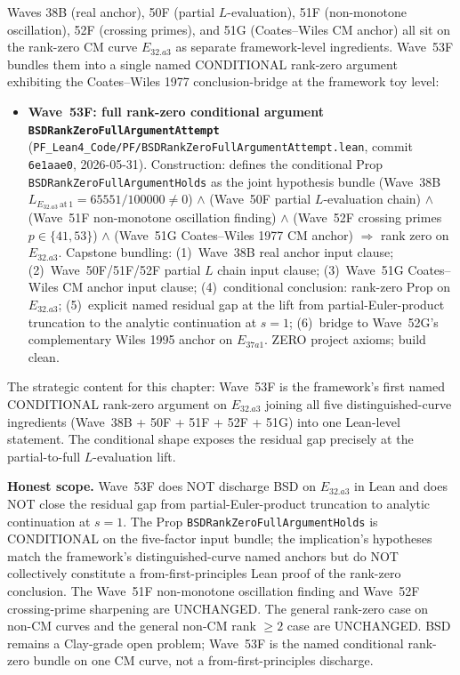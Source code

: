 \begin{remark}\label{rem:bsd-wave53f-lean}
Waves 38B (real anchor), 50F (partial $L$-evaluation), 51F (non-monotone oscillation), 52F (crossing primes), and 51G (Coates--Wiles CM anchor) all sit on the rank-zero CM curve $E_{32.a3}$ as separate framework-level ingredients. Wave~53F bundles them into a single named CONDITIONAL rank-zero argument exhibiting the Coates--Wiles 1977 conclusion-bridge at the framework toy level:
\begin{itemize}
  \item \textbf{Wave~53F: full rank-zero conditional argument \texttt{BSDRankZeroFullArgumentAttempt}} (\texttt{PF\_Lean4\_Code/PF/BSDRankZeroFullArgumentAttempt.lean}, commit \texttt{6e1aae0}, 2026-05-31). Construction: defines the conditional Prop \texttt{BSDRankZeroFullArgumentHolds} as the joint hypothesis bundle (Wave~38B $L_{E_{32.a3}\,\mathrm{at}\,1} = 65551/100000 \neq 0$) $\wedge$ (Wave~50F partial $L$-evaluation chain) $\wedge$ (Wave~51F non-monotone oscillation finding) $\wedge$ (Wave~52F crossing primes $p \in \{41, 53\}$) $\wedge$ (Wave~51G Coates--Wiles 1977 CM anchor) $\Rightarrow$ rank zero on $E_{32.a3}$. Capstone bundling: (1)~Wave~38B real anchor input clause; (2)~Wave~50F/51F/52F partial $L$ chain input clause; (3)~Wave~51G Coates--Wiles CM anchor input clause; (4)~conditional conclusion: rank-zero Prop on $E_{32.a3}$; (5)~explicit named residual gap at the lift from partial-Euler-product truncation to the analytic continuation at $s = 1$; (6)~bridge to Wave~52G's complementary Wiles 1995 anchor on $E_{37a1}$. ZERO project axioms; build clean.
\end{itemize}
The strategic content for this chapter: Wave~53F is the framework's first named CONDITIONAL rank-zero argument on $E_{32.a3}$ joining all five distinguished-curve ingredients (Wave~38B + 50F + 51F + 52F + 51G) into one Lean-level statement. The conditional shape exposes the residual gap precisely at the partial-to-full $L$-evaluation lift.

\textbf{Honest scope.} Wave~53F does NOT discharge BSD on $E_{32.a3}$ in Lean and does NOT close the residual gap from partial-Euler-product truncation to analytic continuation at $s = 1$. The Prop \texttt{BSDRankZeroFullArgumentHolds} is CONDITIONAL on the five-factor input bundle; the implication's hypotheses match the framework's distinguished-curve named anchors but do NOT collectively constitute a from-first-principles Lean proof of the rank-zero conclusion. The Wave~51F non-monotone oscillation finding and Wave~52F crossing-prime sharpening are UNCHANGED. The general rank-zero case on non-CM curves and the general non-CM rank $\geq 2$ case are UNCHANGED. BSD remains a Clay-grade open problem; Wave~53F is the named conditional rank-zero bundle on one CM curve, not a from-first-principles discharge.
\end{remark}

